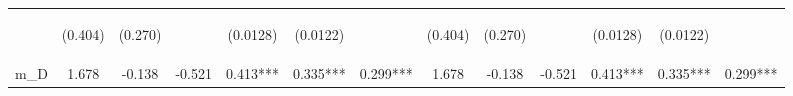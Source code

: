 \documentclass[]{article}
\begin{document}
\begin{center}
\begin{tabular}{lcccccccccccc}
\vspace{4pt} & \begin{footnotesize}(0.404)\end{footnotesize} & \begin{footnotesize}(0.270)\end{footnotesize} & \begin{footnotesize}\end{footnotesize} & \begin{footnotesize}(0.0128)\end{footnotesize} & \begin{footnotesize}(0.0122)\end{footnotesize} & \begin{footnotesize}\end{footnotesize} & \begin{footnotesize}(0.404)\end{footnotesize} & \begin{footnotesize}(0.270)\end{footnotesize} & \begin{footnotesize}\end{footnotesize} & \begin{footnotesize}(0.0128)\end{footnotesize} & \begin{footnotesize}(0.0122)\end{footnotesize} & \begin{footnotesize}\end{footnotesize} \\
m\_D & 1.678 & -0.138 & -0.521 & 0.413*** & 0.335*** & 0.299*** & 1.678 & -0.138 & -0.521 & 0.413*** & 0.335*** & 0.299*** \\

\end{tabular}
\end{center}
\end{document}
